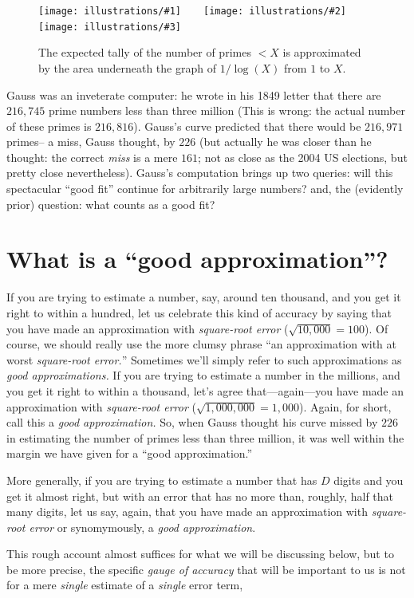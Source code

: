\documentclass[11pt]{article}
\newcommand{\illthree}[5]{ 
   \begin{figure}[H]
   \begin{center}
   \texttt{[image: illustrations/\#1]}$\qquad$\texttt{[image: illustrations/\#2]}$\qquad$\texttt{[image: illustrations/\#3]}
   \caption{#5}
    \end{center}
    \end{figure}
}
\theoremstyle{plain}
\theoremstyle{definition}
\numberwithin{equation}{section}
\numberwithin{figure}{section}
\numberwithin{table}{section}
\begin{document}
\illthree{area_under_log_graph_30}{area_under_log_graph_100}{area_under_log_graph_1000}{.3}{The
  expected tally of the number of primes $<X$ is approximated by the
  area underneath the graph of $1/\log(X)$ from $1$ to $X$.}

           
Gauss was an inveterate computer: he wrote in his 1849 letter that
there are $216,\!745$ prime numbers less than three million (This is
wrong: the actual number of these primes is $216,\!816$). Gauss's curve
predicted that there would be $216,\!971$ primes-- a miss, Gauss
thought, by $226$ (but actually he was closer than he thought: the
correct {\em miss} is a mere $161$; not as close as the 2004 US
elections, but pretty close nevertheless).  
Gauss's computation brings up two queries: will this spectacular ``good
fit'' continue for arbitrarily large numbers? and, the (evidently
prior) question: what counts as a good fit?


\section{What is a ``good approximation''?}\label{sec:sqrterror}

If you are trying to estimate a number, say, around ten thousand, and
you get it right to within a hundred, let us celebrate this kind of
accuracy by saying that you have made an approximation with {\em
  square-root error} (${\sqrt{10,\!000}}=100$). Of course, we should
really use the more clumsy phrase ``an approximation with at worst
{\em square-root error.}''  Sometimes we'll simply refer to such
approximations as {\em good approximations.} If you are trying to
estimate a number in the millions, and you get it right to within a
thousand, let's agree that---again---you have made an approximation
with {\em square-root error} (${\sqrt{1,\!000,\!000}}=1,\!000$).
Again, for short, call this a {\em good approximation.} So, when Gauss
thought his curve missed by $226$ in estimating the number of primes
less than three million, it was well within the margin we have given
for a ``good approximation.''

More generally, if you are trying to estimate a number that has $D$
digits and you get it almost right, but with an error that has no more
than, roughly, half that many digits, let us say, again, that you have
made an approximation with {\em square-root error} or synomymously, a
{\em good approximation}.


This rough account almost suffices for what we will be discussing
below, but to be more precise, the specific {\em gauge of accuracy}
that will be important to us is not for a mere {\em single} estimate
of a {\em single} error term, \bigskip
 
\end{document}
